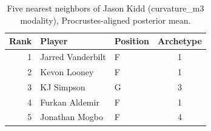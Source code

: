 \begin{table}[htbp]
  \centering\small
  \begin{tabular}{rllc}
    \toprule
    Rank & Player & Position & Archetype \\
    \midrule
    1 & Jarred Vanderbilt & F & 1 \\
    2 & Kevon Looney & F & 1 \\
    3 & KJ Simpson & G & 3 \\
    4 & Furkan Aldemir & F & 1 \\
    5 & Jonathan Mogbo & F & 4 \\
    \bottomrule
  \end{tabular}
  \caption{Five nearest neighbors of Jason Kidd (curvature_m3 modality), Procrustes-aligned posterior mean.}
  \label{tab:Jason_Kidd_neighbors_curvature_m3}
\end{table}

